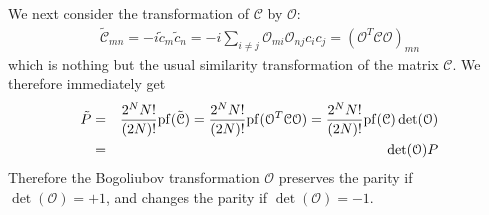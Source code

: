 We next consider the transformation of $\mathcal{C}$ by $\mathcal{O}$:
\begin{eqnarray}
	\tilde{\mathcal{C}}_{mn} = -i \tilde{c}_m \tilde{c}_n = -i\sum_{i\neq j} \mathcal{O}_{mi}\mathcal{O}_{nj} c_i c_j = (\mathcal{O}^T \mathcal{C}\mathcal{O})_{mn}
\end{eqnarray}
which is nothing but the usual similarity transformation of the matrix $\mathcal{C}$. We therefore immediately get
\begin{eqnarray}
	\tilde{P} &=& \frac{2^N N!}{(2N)!} {\rm pf}(\tilde{\mathcal{C}}) = \frac{2^N N!}{(2N)!} {\rm pf}(\mathcal{O}^T \mathcal{C}\mathcal{O}) = \frac{2^N N!}{(2N)!} {\rm pf}(\mathcal{C}) \det(\mathcal{O})\\\nonumber
	&=& \det(\mathcal{O}) P
\end{eqnarray}
Therefore the Bogoliubov transformation $\mathcal{O}$ preserves the parity if $\det(\mathcal{O}) = +1$, and changes the parity if $\det(\mathcal{O}) = -1$.

